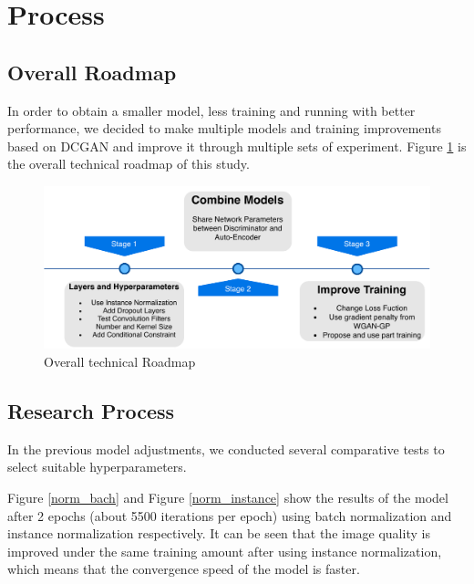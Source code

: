 \section{Process}
\subsection{Overall Roadmap}

In order to obtain a smaller model, less training and running with better performance,
we decided to make multiple models and training improvements based on DCGAN and improve it through multiple sets of experiment.
Figure \ref{roadmap} is the overall technical roadmap of this study.

\begin{figure}
    \begin{center}
    \includegraphics[width=\textwidth]{figures/roadmap.pdf}
    \caption{Overall technical Roadmap}
    \label{roadmap}
    \end{center}
\end{figure}


\subsection{Research Process}

In the previous model adjustments, we conducted several comparative tests to select suitable hyperparameters.

Figure \ref{norm_bach} and Figure \ref{norm_instance} show the results of the model after 2 epochs (about 5500 iterations per epoch) using batch normalization and instance normalization respectively.
It can be seen that the image quality is improved under the same training amount after using instance normalization, which means that the convergence speed of the model is faster.

